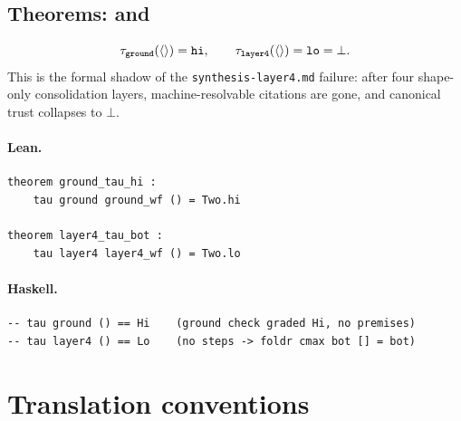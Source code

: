 \documentclass[11pt,a4paper]{article}
\begin{document}
\subsection{Theorems:  and }

\begin{thm}
\[
  \tau_{\texttt{ground}}(\langle\rangle) = \mathtt{hi},
  \qquad
  \tau_{\texttt{layer4}}(\langle\rangle) = \mathtt{lo} = \bot.
\]
This is the formal shadow of the \texttt{synthesis-layer4.md} failure: after
four shape-only consolidation layers, machine-resolvable citations are gone,
and canonical trust collapses to $\bot$.
\end{thm}

\paragraph{Lean.}
\begin{lstlisting}[style=lean]
theorem ground_tau_hi :
    tau ground ground_wf () = Two.hi

theorem layer4_tau_bot :
    tau layer4 layer4_wf () = Two.lo
\end{lstlisting}

\paragraph{Haskell.}
\begin{lstlisting}[style=haskell]
-- tau ground () == Hi    (ground check graded Hi, no premises)
-- tau layer4 () == Lo    (no steps -> foldr cmax bot [] = bot)
\end{lstlisting}

\section{Translation conventions}
\end{document}
